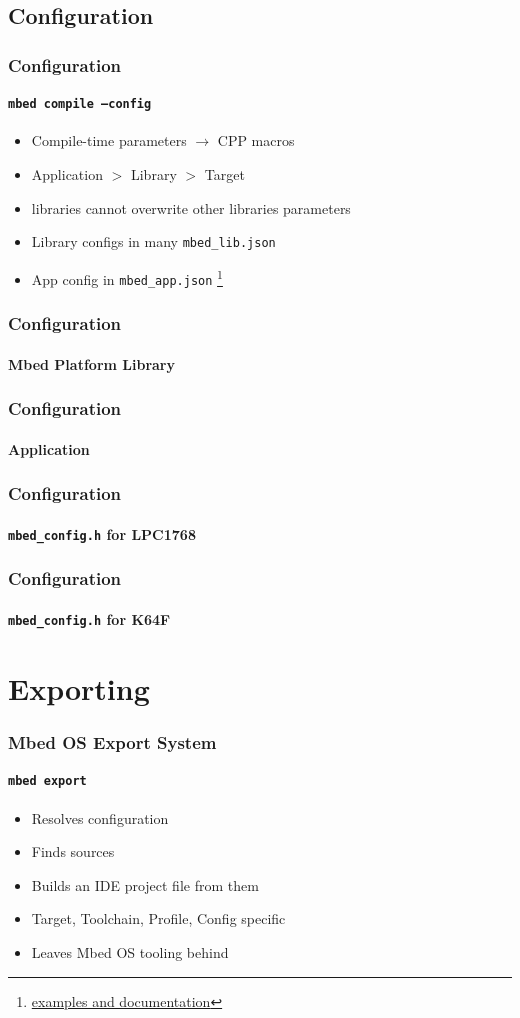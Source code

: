 \documentclass{beamer}
\begin{document}
\subsection{Configuration}
\begin{frame}
  \frametitle{Configuration}
  \framesubtitle{\texttt{mbed compile --config}}
  \begin{itemize}
  \item Compile-time parameters $\rightarrow$ CPP macros
  \item Application $>$ Library $>$ Target
  \item libraries cannot overwrite other libraries parameters
  \item Library configs in many \texttt{mbed\_lib.json}
  \item App config in \texttt{mbed\_app.json}
  \footnote{\href{https://os.mbed.com/docs/v5.6/tools/configuring-tools.html}{examples and documentation}}
  \end{itemize}
\end{frame}
\begin{frame}
  \frametitle{Configuration}
  \framesubtitle{Mbed Platform Library}
  
\end{frame}
\begin{frame}
  \frametitle{Configuration}
  \framesubtitle{Application}
  
\end{frame}
\begin{frame}
  \frametitle{Configuration}
  \framesubtitle{\texttt{mbed\_config.h} for LPC1768}
  
\end{frame}
\begin{frame}
  \frametitle{Configuration}
  \framesubtitle{\texttt{mbed\_config.h} for K64F}
  
\end{frame}
\section{Exporting}
\begin{frame}
  \frametitle{Mbed OS Export System}
  \framesubtitle{\texttt{mbed export}}
  \begin{itemize}
  \item Resolves configuration
  \item Finds sources
  \item Builds an IDE project file from them
  \item Target, Toolchain, Profile, Config specific
  \item Leaves Mbed OS tooling behind
  \end{itemize}
\end{frame}
\end{document}
